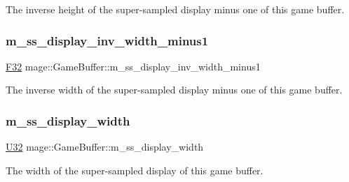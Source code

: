 The inverse height of the super-\/sampled display minus one of this game buffer. \hypertarget{structmage_1_1_game_buffer_ad2d605152c5c5a3e0059e65fd6814238}{}\label{structmage_1_1_game_buffer_ad2d605152c5c5a3e0059e65fd6814238} 
\subsubsection{\texorpdfstring{m\+\_\+ss\+\_\+display\+\_\+inv\+\_\+width\+\_\+minus1}{m\_ss\_display\_inv\_width\_minus1}}
{\footnotesize\ttfamily \hyperlink{namespacemage_aa97e833b45f06d60a0a9c4fc22ae02c0}{F32} mage\+::\+Game\+Buffer\+::m\+\_\+ss\+\_\+display\+\_\+inv\+\_\+width\+\_\+minus1}

The inverse width of the super-\/sampled display minus one of this game buffer. \hypertarget{structmage_1_1_game_buffer_a5571b4b908c0e25083d3b8949d1c7706}{}\label{structmage_1_1_game_buffer_a5571b4b908c0e25083d3b8949d1c7706} 
\subsubsection{\texorpdfstring{m\+\_\+ss\+\_\+display\+\_\+width}{m\_ss\_display\_width}}
{\footnotesize\ttfamily \hyperlink{namespacemage_a41c104c036fba3756a74e19f793eeaa1}{U32} mage\+::\+Game\+Buffer\+::m\+\_\+ss\+\_\+display\+\_\+width}

The width of the super-\/sampled display of this game buffer. 